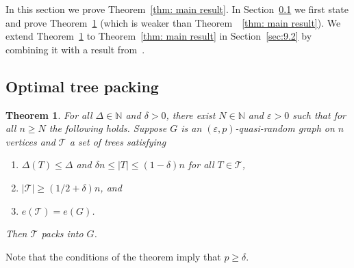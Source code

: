 \documentclass[a4paper, 11pt, reqno]{amsart}
\newtheorem{theorem}[definition]{Theorem}
\numberwithin{equation}{section}
\newcommand{\1}{{\rm 1\hspace*{-0.4ex}%
\rule{0.1ex}{1.52ex}\hspace*{0.2ex}}}
\newcommand{\N}{\mathbb N}
\newcommand{\cT}{\mathcal{T}}
\renewcommand{\epsilon}{\varepsilon}
\newcounter{step}
\begin{document}
In this section we prove Theorem~\ref{thm: main result}.
In Section~\ref{sec:9.1}
we first state and prove Theorem~\ref{thm: main result step1} (which is weaker than Theorem~~\ref{thm: main result}).
We extend Theorem~\ref{thm: main result step1} to Theorem~\ref{thm: main result} in Section~\ref{sec:9.2}
by combining it with a result from~\cite{KKOT16}.

\subsection{Optimal tree packing}\label{sec:9.1}

\begin{theorem}\label{thm: main result step1}
For all $\Delta \in \N$ and $\delta>0$, 
there exist $N\in \N$ and $\epsilon>0$ such that
for all $n\geq N$ the following holds.
Suppose $G$ is an $(\epsilon,p)$-quasi-random graph on $n$ vertices and $\cT$ a set of trees satisfying 
\begin{enumerate}[label=(\roman*)]
	\item\label{item:MT11} $\Delta(T)\leq \Delta$ and $\delta n \leq |T|\leq (1- \delta)n$ for all $T\in \cT$,
	\item\label{item:MT13} $|\cT|\geq (1/2+ \delta)n$, and
	\item\label{item:MT14} $e(\cT)=e(G)$.
\end{enumerate}
Then $\cT$ packs into $G$.
\end{theorem}

Note that the conditions of the theorem imply that $p\geq \delta$.
 
\end{document}
